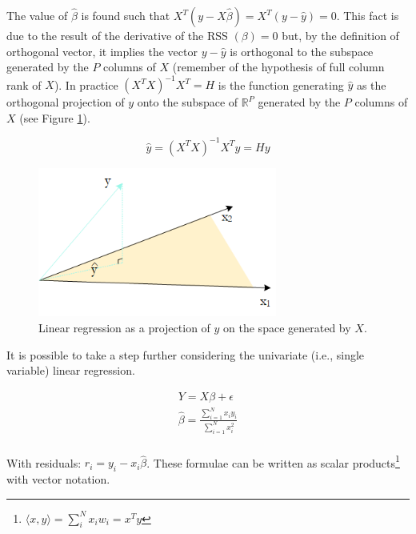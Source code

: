 The value of $\hat{\beta}$ is found such that $X^T\left(y-X\hat{\beta}\right)=X^T\left(y-\hat{y}\right)=0$. This fact is due to the result of the derivative of the RSS $\left(\beta\right)=0$ but, by the definition of orthogonal vector, it implies the vector $y-\hat{y}$ is orthogonal to the subspace generated by the $P$ columns of $X$ (remember of the hypothesis of full column rank of $X$). In practice $\left(X^TX\right)^{-1}X^T=H$ is the function generating $\hat{y}$ as the orthogonal projection of $y$ onto the subspace of $\mathbb{R}^P$ generated by the $P$ columns of $X$ (see Figure \ref{fig_projection}).

\begin{equation}
\hat{y}=\left(X^TX\right)^{-1}X^Ty=Hy
\label{eq_OLSgeo2}
\end{equation}

\begin{figure}[hbt!]
\centering
\includegraphics[width=0.7\textwidth]{SectionLetsMath/linearRegression_figures/fig_projection.png}
\captionsetup{type=figure}
\caption{Linear regression as a projection of $y$ on the space generated by $X$.}
\label{fig_projection}
\end{figure}

It is possible to take a step further considering the univariate (i.e., single variable) linear regression.

\begin{equation}
\begin{split}
Y=X\beta+\epsilon \\
\hat{\beta}=\frac{\sum_{i=1}^{N}{x_iy_i}}{\sum_{i=1}^{N}x_i^2}\\
\end{split}
\label{eq_OLSgeo3}
\end{equation}

With residuals: $r_i=y_i-x_i\hat{\beta}$. These formulae can be written as scalar products\footnote{$\langle x,y \rangle=\sum_{i}^{N}x_iw_i=x^Ty$} with vector notation. 

